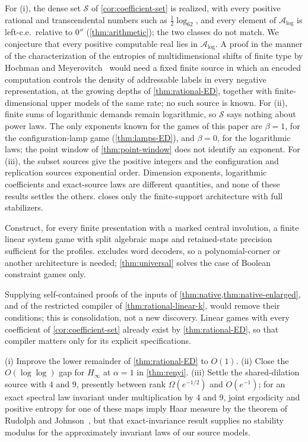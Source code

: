 For (i), the dense set $\mathcal S$ of \cref{cor:coefficient-set} is realized, with every positive rational and transcendental numbers
such as $\frac12\log_62$, and every element of $\mathcal A_{\log}$ is left-c.e.\ relative to $0''$ (\cref{thm:arithmetic}); the two classes do
not match. We conjecture that every positive computable real lies in $\mathcal A_{\log}$. A proof in the manner of the characterization of
the entropies of multidimensional shifts of finite type by Hochman and Meyerovitch~\cite{HM10} would need a fixed finite source in which an
encoded computation controls the density of addressable labels in every negative representation, at the growing depths of
\cref{thm:rational-ED}, together with finite-dimensional upper models of the same rate; no such source is known. For (ii), finite sums of
logarithmic demands remain logarithmic, so $\mathcal S$ says nothing about power laws. The only exponents known for the games of this paper
are $\beta=1$, for the configuration-lamp game (\cref{thm:lamps-ED}), and $\beta=0$, for the logarithmic laws; the point window of
\cref{thm:point-window} does not identify an exponent. For
(iii), the subset sources give the positive integers and the configuration and replication sources exponential order. Dimension
exponents, logarithmic coefficients and exact-source laws are different quantities, and none of these results settles the others.
 closes only the finite-support architecture with full stabilizers.

\begin{problem}\label{prob:linear}
Construct, for every finite presentation with a marked central involution, a finite linear system game with split algebraic maps
and retained-state precision sufficient for the profiles.  excludes word decoders, so a polynomial-corner or
another architecture is needed; \cref{thm:universal} solves the case of Boolean constraint games only.
\end{problem}

Supplying self-contained proofs of the inputs of \cref{thm:native,thm:native-enlarged}, and of the restricted compiler of
\cref{thm:rational-linear-k}, would remove their conditions; this is consolidation, not a new discovery. Linear games with every
coefficient of \cref{cor:coefficient-set} already exist by \cref{thm:rational-ED}, so that compiler matters only for its explicit
specifications.

\begin{problem}\label{prob:analytic}
(i) Improve the lower remainder of \cref{thm:rational-ED} to $O(1)$. (ii) Close the $O(\log\log)$ gap for $H_\infty$ at $\alpha=1$ in
\cref{thm:renyi}. (iii) Settle the shared-dilation source with $4$ and $9$, presently between rank $\Omega(e^{-1/2})$ and $O(e^{-1})$;
for an exact spectral law invariant under multiplication by $4$ and $9$, joint ergodicity and positive entropy for one of these
maps imply Haar measure by the theorem of Rudolph and Johnson~\cite{Rud90,Joh92}, but that exact-invariance result supplies no
stability modulus for the approximately invariant laws of our source models.
\end{problem}

